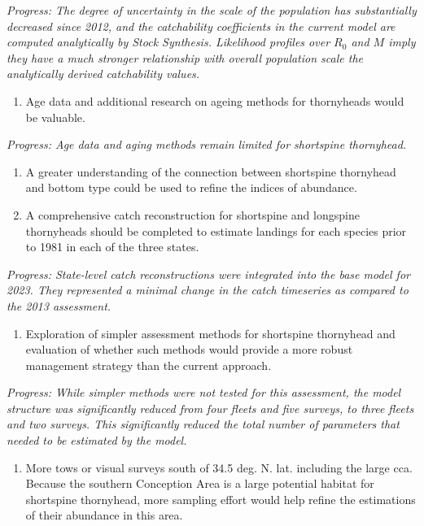 \documentclass[11pt,
  english,
  letterpaper,
]{article}
\providecommand{\tightlist}{%
  \setlength{\itemsep}{0pt}\setlength{\parskip}{0pt}}
\providecommand{\tightlist}{%
  \setlength{\itemsep}{0pt}\setlength{\parskip}{0pt}}
\begin{document}
\emph{Progress: The degree of uncertainty in the scale of the population has substantially decreased since 2012, and the catchability coefficients in the current model are computed analytically by Stock Synthesis. Likelihood profiles over \(R_0\) and \(M\) imply they have a much stronger relationship with overall population scale the analytically derived catchability values.}

\begin{enumerate}
\def\labelenumi{\arabic{enumi}.}
\setcounter{enumi}{3}
\tightlist
\item
  Age data and additional research on ageing methods for thornyheads would be valuable.
\end{enumerate}

\emph{Progress: Age data and aging methods remain limited for shortspine thornyhead.}

\begin{enumerate}
\def\labelenumi{\arabic{enumi}.}
\setcounter{enumi}{4}
\tightlist
\item
  A greater understanding of the connection between shortspine thornyhead and bottom type could be used to refine the indices of abundance.
\item
  A comprehensive catch reconstruction for shortspine and longspine thornyheads should be completed to estimate landings for each species prior to 1981 in each of the three states.
\end{enumerate}

\emph{Progress: State-level catch reconstructions were integrated into the base model for 2023. They represented a minimal change in the catch timeseries as compared to the 2013 assessment.}

\begin{enumerate}
\def\labelenumi{\arabic{enumi}.}
\setcounter{enumi}{6}
\tightlist
\item
  Exploration of simpler assessment methods for shortspine thornyhead and evaluation of whether such methods would provide a more robust management strategy than the current approach.
\end{enumerate}

\emph{Progress: While simpler methods were not tested for this assessment, the model structure was significantly reduced from four fleets and five surveys, to three fleets and two surveys. This significantly reduced the total number of parameters that needed to be estimated by the model.}

\begin{enumerate}
\def\labelenumi{\arabic{enumi}.}
\setcounter{enumi}{7}
\tightlist
\item
  More tows or visual surveys south of 34.5 deg. N. lat. including the large \gls{cca}. Because the southern Conception Area is a large potential habitat for shortspine thornyhead, more sampling effort would help refine the estimations of their abundance in this area.
\end{enumerate}
\end{document}
